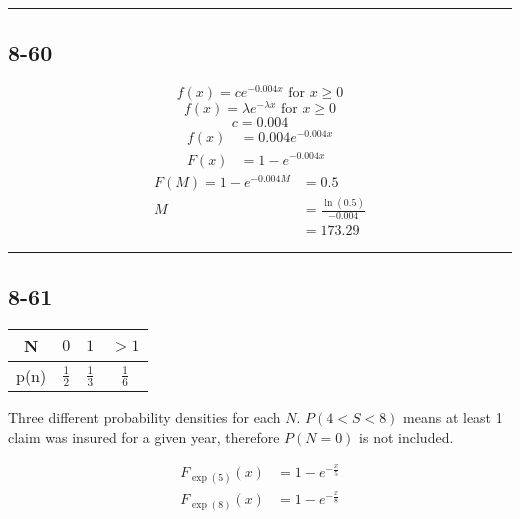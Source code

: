 \documentclass{article}
\newcommand{\qline}{\par\noindent\rule{4.5in}{1pt}}
\begin{document}
	\qline

		\subsection*{8-60}

			\[
				f(x) = c e^{-0.004x} \text{ for } x \geq 0
			\]
			\[
				f(x) = \lambda e^{-\lambda x} \text{ for } x \geq 0
			\]
			\[
				c = 0.004
			\]
			\begin{equation*}
				\begin{split}
					f(x) &= 0.004e^{-0.004x} \\
					F(x) &= 1 - e^{-0.004x}
				\end{split}
			\end{equation*}
			\begin{equation*}
				\begin{split}
					F(M) = 1 - e^{-0.004M} &= 0.5 \\
					M &= \frac{\ln(0.5)}{-0.004} \\
					&= \boxed{\num{173.29}}
				\end{split}
			\end{equation*}

	\qline

		\subsection*{8-61}

			\begin{center}
				\renewcommand\arraystretch{1.2}
				\begin{tabular}{c|c|c|c}
					N & $0$ & $1$ & $>1$ \\ \hline
					p(n) & $\frac{1}{2}$ & $\frac{1}{3}$ & $\frac{1}{6}$ \\
				\end{tabular} \vspace{5mm}
				\par
				Three different probability densities for each $N$. $P(4 < S < 8)$ means at least 1 claim was insured for a given year, therefore $P(N=0)$ is not included.
			\end{center}

			\begin{equation*}
				\begin{split}
					F_{\exp(5)}(x) &= 1 - e^{-\frac{x}{5}} \\
					F_{\exp(8)}(x) &= 1 - e^{-\frac{x}{8}} \\
				\end{split}
			\end{equation*}
\end{document}
